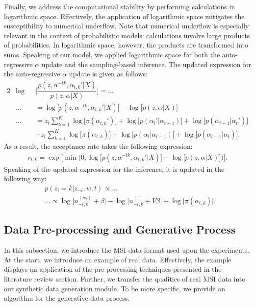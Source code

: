 \documentclass{mpaper}
\begin{document}
\par Finally, we address the computational stability by performing calculations in logarithmic space. Effectively, the application of logarithmic space mitigates the susceptibility to numerical underflow. Note that numerical underflow is especially relevant in the context of probabilistic models: calculations involve large products of probabilities. In logarithmic space, however, the products are transformed into sums. Speaking of our model, we applied logarithmic space for both the auto-regressive $\alpha$ update and the sampling-based inference. The updated expression for the auto-regressive $\alpha$ update is given as follows:
\begin{alignat*}{2}
  &\log&&\bigg[{\dfrac{p(z,\alpha^{-tk},\alpha_{t, k}'|X)}{p(z,\alpha|X)}}\bigg] = \ldots \\
  & \ldots && = \log\big[{p(z,\alpha^{-tk},\alpha_{t, k}'|X)}\big] - \log\big[{p(z,\alpha|X)}\big]\\
  & \ldots && = z_{t}\sum_{k=1}^K\log\big[\pi(\alpha_{t,k}')\big] + \log\big[p(\alpha_t'|\alpha_{t-1})\big] + \log\big[p(\alpha_{t+1}|\alpha_t')\big]\\
  & && - z_{t}\sum_{k=1}^K\log\big[\pi(\alpha_{t, k})\big] + \log\big[p(\alpha_t|\alpha_{t-1})\big] + \log\big[p(\alpha_{t+1}|\alpha_t)\big].
\end{alignat*}
As a result, the acceptance rate takes the following expression:
\begin{align*}
	r_{t,k} = \exp\big[\min{\big(0, \log\big[{p(z,\alpha^{-tk},\alpha_{t, k}'|X)}\big] - \log\big[{p(z,\alpha|X)}\big]}\big)\big].
\end{align*}
Speaking of the updated expression for the inference, it is updated in the following way:
\begin{align*}
&p(z_i = k | z_{-i}, w, t) \propto \ldots\\
&\ldots \propto \log\big[n_{-i, k}^{(w_i)} + \beta\big] - \log\big[n_{-i, k}^{(\cdot)} + V\beta\big] + \log\big[\pi(\alpha_{t,k})\big].
\end{align*}

\subsection{Data Pre-processing and Generative Process}

\par In this subsection, we introduce the MSI data format used upon the experiments. At the start, we introduce an example of real data. Effectively, the example displays an application of the pre-processing techniques presented in the literature review section. Further, we transfer the qualities of real MSI data into our synthetic data generation module. To be more specific, we provide an algorithm for the generative data process.
\end{document}
